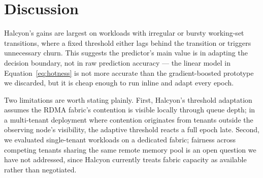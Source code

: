 \section{Discussion}
Halcyon's gains are largest on workloads with irregular or bursty working-set transitions, where a fixed threshold either lags behind the transition or triggers unnecessary churn. This suggests the predictor's main value is in adapting the decision boundary, not in raw prediction accuracy — the linear model in Equation~\ref{eq:hotness} is not more accurate than the gradient-boosted prototype we discarded, but it is cheap enough to run inline and adapt every epoch.

Two limitations are worth stating plainly. First, Halcyon's threshold adaptation assumes the RDMA fabric's contention is visible locally through queue depth; in a multi-tenant deployment where contention originates from tenants outside the observing node's visibility, the adaptive threshold reacts a full epoch late. Second, we evaluated single-tenant workloads on a dedicated fabric; fairness across competing tenants sharing the same remote memory pool is an open question we have not addressed, since Halcyon currently treats fabric capacity as available rather than negotiated.
